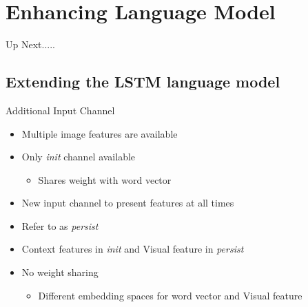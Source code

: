 \documentclass{beamer}
\begin{document}
\section{Enhancing Language Model}
\begin{frame}{Up Next.....}
\tableofcontents[currentsection] 
\end{frame}
\subsection{Extending the LSTM language model}
\begin{frame}{Additional Input Channel}
    \begin{itemize}
        \item Multiple image features are available 
        \item Only \emph{init} channel available 
            \begin{itemize}
                \item Shares weight with word vector
            \end{itemize}
        \item New input channel to present features at all times
        \item Refer to as \emph{persist}
        \item Context features in \emph{init} and Visual feature in \emph{persist} 
        \item No weight sharing 
            \begin{itemize}
                \item Different embedding spaces for word vector and Visual feature 
            \end{itemize}
    \end{itemize}
\end{frame}
\end{document}

